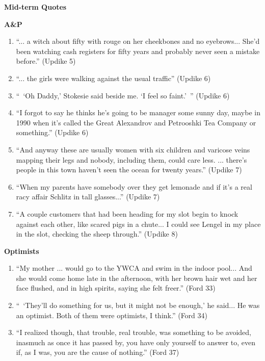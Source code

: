 \documentclass[10pt,letterpaper]{article}
\begin{document}
{\center\textbf{Mid-term Quotes} \\}

\textbf{A\&P}
\begin{enumerate}
\item ``... a witch about fifty with rouge on her cheekbones and no eyebrows...
She'd been watching cash registers for fifty years and probably never seen a
mistake before.'' (Updike 5)

\item ``... the girls were walking against the usual traffic'' (Updike 6)

\item ``\ `Oh Daddy,' Stokesie said beside me.  `I feel so faint.'\ '' (Updike
6)

\item ``I forgot to say he thinks he's going to be manager some sunny day, maybe
in 1990 when it's called the Great Alexandrov and Petrooshki Tea Company or
something.'' (Updike 6)

\item ``And anyway these are usually women with six children and varicose veins
mapping their legs and nobody, including them, could care less. ... there's
people in this town haven't seen the ocean for twenty years.'' (Updike 7)

\item ``When my parents have somebody over they get lemonade and if it's a real
racy affair Schlitz in tall glasses...'' (Updike 7)

\item ``A couple customers that had been heading for my slot begin to knock
against each other, like scared pigs in a chute...  I could see Lengel in my
place in the slot, checking the sheep through.'' (Updike 8)
\end{enumerate}

\textbf{Optimists}
\begin{enumerate}
\item ``My mother ... would go to the YWCA and swim in the indoor pool...  And
she would come home late in the afternoon, with her brown hair wet and her face
flushed, and in high spirits, saying she felt freer.'' (Ford 33)

\item ``\ `They'll do something for us, but it might not be enough,' he said...
He was an optimist.  Both of them were optimists, I think.'' (Ford 34)

\item ``I realized though, that trouble, real trouble, was something to be
avoided, inasmuch as once it has passed by, you have only yourself to answer to,
even if, as I was, you are the cause of nothing.'' (Ford 37)
\end{enumerate}
\end{document}
